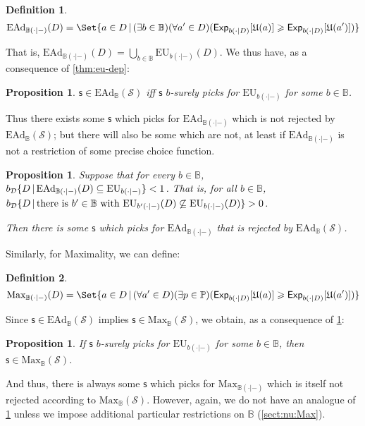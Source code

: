 \documentclass[a4paper]{article}
\newtheorem{definition}{Definition}
\newtheorem{proposition}[theorem]{Proposition}
\newcommand\D{\mathcal{D}}
\renewcommand\S{\mathcal{S}}
\newcommand\s{\mathsf{s}}
\renewcommand\P{\mathbb{P}} %
\newcommand\Exp{\mathsf{Exp}}
\newcommand\EU{\mathrm{EU}}
\newcommand\EAd{\mathrm{EAd}}
\newcommand\U{\mathfrak{U}} %
\newcommand\Maximality{\mathrm{Max}}
\newcommand{\IB}{\mathbb{B}}
\newcommand{\IP}{\P}
\newcommand{\pb}{b}
\newcommand{\todoinfo}[2][]{\todo[backgroundcolor=orange!80,bordercolor=black,linecolor=gray!80, #1,inline,caption={}]{#2}}
\renewcommand{\color}[1]{}
\newcommand{\Strategies}{\mathcal{S}}
\newcommand\SetDelimiter[1][]{
	\nonscript\,#1\vert \allowbreak \nonscript\,\mathopen{}}
\providecommand\given{\SetDelimiter}
\renewcommand{\geq}{\geqslant}
\newenvironment{CCM rewritten}
{\begingroup\color{blue}} %
{\endgroup}              %
\begin{document}
{\begin{definition}
	$$\EAd_{\IB(\cdot|-)}(D) = \Set{a \in D \given (\exists \pb \in \IB)(\forall a' \in D)(\Exp_{\pb(\cdot|D)}[\U(a)]\geq\Exp_{\pb(\cdot|D)}[\U(a')])}
	$$\end{definition}
	That is, $\EAd_{\IB(\cdot|-)}(D)=\bigcup_{\pb\in\IB}\EU_{\pb(\cdot|-)}(D)$. We thus have, as a consequence of \cref{thm:eu-dep}: 
	\begin{proposition}\label{thm:ead-equiv[dep]}
		$\s\in\EAd_\IB(\Strategies)$ iff $\s$ $\pb$-surely picks for $\EU_{\pb(\cdot|-)}$ for some $\pb\in \IB$. 		
	\end{proposition}
	Thus there exists some $\s$ which picks for $\EAd_{\IB(\cdot|-)}$ which is not rejected by $\EAd_\IB(\Strategies)$; but there will also be some which are not, at least if $\EAd_{\IB(\cdot|-)}$ is not a restriction of some precise choice function. 
		\begin{proposition}\label{thm:ead-existence[dep]}
Suppose that for every $\pb\in\IB$, $\pb_\D\{D\given \EAd_{\IB(\cdot|-)}(D)\subseteq\EU_{\pb(\cdot|-)}\}<1$. That is, for all $\pb\in \IB$, $\pb_\D\{D\given \text{there is $\pb'\in\IB$ with }\EU_{\pb'(\cdot|-)}(D)\not\subseteq\EU_{\pb(\cdot|-)}(D)\}>0$. 
	
	Then there is some $\s$ which picks for $\EAd_{\IB(\cdot|-)}$ that is rejected by $\EAd_\IB(\Strategies)$.
\end{proposition}

Similarly, for Maximality, we can define: 
\begin{definition}
	$$\Maximality_{\IB(\cdot|-)}(D) = \Set{a \in D \given (\forall a' \in D)(\exists p\in\IP)(\Exp_{\pb(\cdot|D)}[\U(a)]\geq\Exp_{\pb(\cdot|D)}[\U(a')])}
	$$\end{definition}
	Since $\s\in\EAd_\IB(\S)$ implies $\s\in\Maximality_\IB(\S)$, we obtain, as a consequence of \cref{thm:ead-equiv[dep]}:
	\begin{proposition}\label{thm:max-suff[dep]}
	If $\s$ $\pb$-surely picks for $\EU_{\pb(\cdot|-)}$ for some $\pb\in \IB$, then $\s\in\Maximality_\IB(\Strategies)$. 
\end{proposition}And thus, there is always some $\s$ which picks for $\Maximality_{\IB(\cdot|-)}$ which is itself not rejected according to $\Maximality_\IB(\Strategies)$. However, again, we do not have %
{\color{red} an analogue of \cref{thm:ead-existence[dep]}} unless we impose additional particular restrictions on $\IB$ (\cref{sect:nu:Max}).




}
\end{document}
